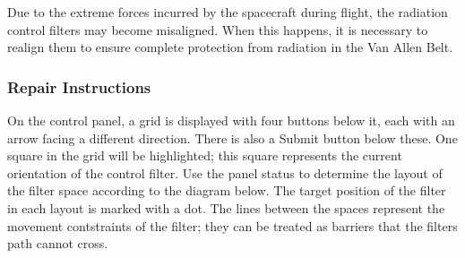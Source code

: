 \documentclass[12pt]{article}
\def\instruc{\subsubsection*{Repair Instructions}}
\begin{document}
Due to the extreme forces incurred by the spacecraft during flight, the radiation control filters may become misaligned. When this happens, it is necessary to realign them to ensure complete protection from radiation in the Van Allen Belt.

\instruc

On the control panel, a grid is displayed with four buttons below it, each with an arrow facing a different direction. There is also a Submit button below these. One square in the grid will be highlighted; this square represents the current orientation of the control filter. Use the panel status to determine the layout of the filter space according to the diagram below. The target position of the filter in each layout is marked with a dot. The lines between the spaces represent the movement contstraints of the filter; they can be treated as barriers that the filters path cannot cross.
\end{document}
